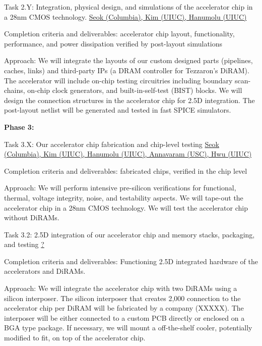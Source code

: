 Task 2.Y: Integration, physical design, and simulations of the accelerator chip in a 28nm CMOS technology. \underline{Seok (Columbia), Kim (UIUC), Hanumolu (UIUC)}

   Completion criteria and deliverables: accelerator chip layout, functionality, performance, and power dissipation verified by post-layout simulations

   Approach: We will integrate the layouts of our custom designed parts (pipelines, caches, links) and third-party IPs (a DRAM controller for Tezzaron's DiRAM). The accelerator will include on-chip testing circuitries including boundary scan-chains, on-chip clock generators, and built-in-self-test (BIST) blocks. We will design the connection structures in the accelerator chip for 2.5D integration. The post-layout netlist will be generated and tested in fast SPICE simulators. 

\noindent
\textbf{Phase 3:}

Task 3.X: Our accelerator chip fabrication and chip-level testing \underline{Seok (Columbia), Kim (UIUC), Hanumolu (UIUC), Annavaram (USC), Hwu (UIUC)}

   Completion criteria and deliverables: fabricated chips, verified in the chip level

   Approach: We will perform intensive pre-silicon verifications for functional, thermal, voltage integrity, noise, and testability aspects. We will tape-out the accelerator chip in a 28nm CMOS technology. We will test the accelerator chip without DiRAMs. 

Task 3.2: 2.5D integration of our accelerator chip and memory stacks, packaging, and testing \underline{?}

   Completion criteria and deliverables: Functioning 2.5D integrated hardware of the accelerators and DiRAMs. 

   Approach:  We will integrate the accelerator chip with two DiRAMs using a silicon interposer. The silicon interposer that creates 2,000 connection to the accelerator chip per DiRAM will be fabricated by a company (XXXXX). The interposer will be either connected to a custom PCB directly or enclosed on a BGA type package. If necessary, we will mount a off-the-shelf cooler, potentially modified to fit, on top of the accelerator chip. 
